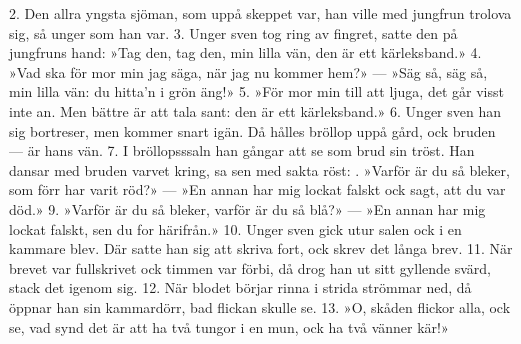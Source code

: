 \setlength{\columnsep}{0.5cm}
\begin{multicols*}{2}
2.  Den allra yngsta sjöman,
    som uppå skeppet var,
    han ville med jungfrun trolova sig,
    så unger som han var.
3.  Unger sven tog ring av fingret,
    satte den på jungfruns hand:
    »Tag den, tag den, min lilla vän,
    den är ett kärleksband.»
4.  »Vad ska för mor min jag säga,
    när jag nu kommer hem?» —
    »Säg så, säg så, min lilla vän:
    du hitta’n i grön äng!»
5.  »För mor min till att ljuga,
    det går visst inte an.
    Men bättre är att tala sant:
    den är ett kärleksband.»
6.  Unger sven han sig bortreser,
    men kommer snart igän.
    Då hålles bröllop uppå gård,
    ock bruden — är hans vän.
7.  I bröllopsssaln han gångar
    att se som brud sin tröst.
    Han dansar med bruden varvet kring,
    sa sen med sakta röst:
\vfill{}.  »Varför är du så bleker,
    som förr har varit röd?» —
    »En annan har mig lockat falskt
    ock sagt, att du var död.»
9.  »Varför är du så bleker,
    varför är du så blå?» —
    »En annan har mig lockat falskt,
    sen du for härifrån.»
10. Unger sven gick utur salen
    ock i en kammare blev.
    Där satte han sig att skriva fort,
    ock skrev det långa brev.
11. När brevet var fullskrivet
    ock timmen var förbi,
    då drog han ut sitt gyllende svärd,
    stack det igenom sig.
12. När blodet börjar rinna
    i strida strömmar ned,
    då öppnar han sin kammardörr,
    bad flickan skulle se.
13. »O, skåden flickor alla,
    ock se, vad synd det är
    att ha två tungor i en mun,
    ock ha två vänner kär!»
\end{multicols*}
